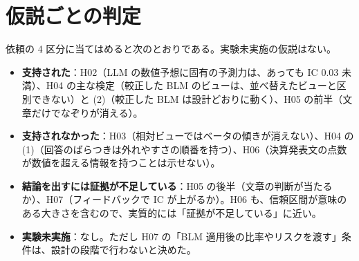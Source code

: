 \documentclass[xelatex,ja=standard,jafont=haranoaji,a4paper,10pt,openany]{bxjsreport}
\begin{document}
\chapter{仮説ごとの判定}\label{ch:verdicts}

\begin{table}[htbp]
\centering
\caption{仮説ごとの判定。主な検定の $p$ 値（両側）と、6 つの主な検定（H02〜H07）に Holm の補正をかけた値。H04 は置換の片側 $p=0.104$ の 2 倍。H03 の $p$ は「絶対ビューで水準と能動ベータが相関する」の部分（判定にはもう 1 つの条件がある）。}
\label{tab:verdicts}
\end{table}

依頼の 4 区分に当てはめると次のとおりである。実験未実施の仮説はない。

\begin{itemize}
\item \textbf{支持された}：H02（LLM の数値予想に固有の予測力は、あっても IC 0.03 未満）、H04 の主な検定（較正した BLM のビューは、並べ替えたビューと区別できない）と (2)（較正した BLM は設計どおりに動く）、H05 の前半（文章だけでなぞりが消える）。
\item \textbf{支持されなかった}：H03（相対ビューではベータの傾きが消えない）、H04 の (1)（回答のばらつきは外れやすさの順番を持つ）、H06（決算発表文の点数が数値を超える情報を持つことは示せない）。
\item \textbf{結論を出すには証拠が不足している}：H05 の後半（文章の判断が当たるか）、H07（フィードバックで IC が上がるか）。H06 も、信頼区間が意味のある大きさを含むので、実質的には「証拠が不足している」に近い。
\item \textbf{実験未実施}：なし。ただし H07 の「BLM 適用後の比率やリスクを渡す」条件は、設計の段階で行わないと決めた。
\end{itemize}
\end{document}
